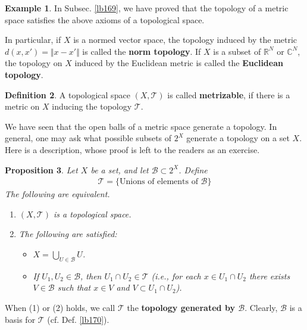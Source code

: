 \documentclass[12pt,b5paper,notitlepage]{article}
\theoremstyle{definition}
\newtheorem{df}{Definition}[section]
\newtheorem{eg}[df]{Example}
\theoremstyle{plain}
\newtheorem{pp}[df]{Proposition}
\newcommand{\mc}{\mathcal}
\newcommand{\Cbb}{\mathbb C}
\newcommand{\Rbb}{\mathbb R}
\numberwithin{equation}{section}
\begin{document}
\begin{eg}
In Subsec. \ref{lb169}, we have proved that the topology of a metric space satisfies the above axioms of a topological space. 

In particular,   if $X$ is a normed vector space, the topology induced by the metric $d(x,x')=\Vert x-x'\Vert$ is called the \textbf{norm topology}.  If $X$ is a subset of $\Rbb^N$ or $\Cbb^N$, the topology on $X$ induced by the Euclidean metric is called the \textbf{Euclidean topology}.   \hfill\qedsymbol
\end{eg}

\begin{df}
A topological space $(X,\mc T)$ is called \textbf{metrizable},  if there is a metric on $X$ inducing the topology $\mc T$. 
\end{df}


We have seen that the open balls of a metric space generate a topology. In general, one may ask what possible subsets of $2^X$ generate a topology on a set $X$. Here is a description, whose proof is left to the readers as an exercise.

\begin{pp}\label{lb171}
Let $X$ be a set, and let $\mc B\subset 2^X$. Define
\begin{align}
\mc T=\{\text{Unions of elements of }\mc B\}
\end{align}
The following are equivalent.
\begin{enumerate}[label=(\arabic*)]
\item $(X,\mc T)$ is a topological space.
\item The following are satisfied:
\begin{itemize}
\item[(2-a)] $X=\bigcup_{U\in\mc B}U$.
\item[(2-b)] If $U_1,U_2\in\mc B$, then $U_1\cap U_2\in\mc T$ (i.e., for each $x\in U_1\cap U_2$ there exists $V\in\mc B$ such that $x\in V$ and $V\subset U_1\cap U_2$).
\end{itemize} 
\end{enumerate}
\end{pp}

When (1) or (2) holds, we call $\mc T$ the \textbf{topology generated by $\mc B$}.  Clearly, $\mc B$ is a basis for $\mc T$ (cf. Def. \ref{lb170}).
\end{document}
